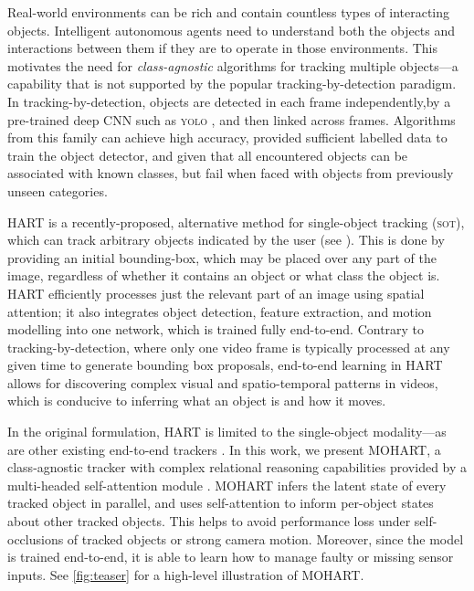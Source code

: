 Real-world environments can be rich and contain countless types of interacting objects.
Intelligent autonomous agents need to understand both the objects and interactions between them if they are to operate in those environments.
This motivates the need for \emph{class-agnostic} algorithms for tracking multiple objects---a capability that is not supported by the popular tracking-by-detection paradigm.
In tracking-by-detection, objects are detected in each frame independently,\eg by a pre-trained deep \gls{CNN} such as \textsc{yolo} \citep{Redmon15}, and then linked across frames. 
%
Algorithms from this family can achieve high accuracy, provided sufficient labelled data to train the object detector, and given that all encountered objects can be associated with known classes, but fail when faced with objects from previously unseen categories.
%

\Gls{HART} is a recently-proposed, alternative method for single-object tracking (\textsc{sot}), which can track arbitrary objects indicated by the user (see ).
%
This is done by providing an initial bounding-box, which may be placed over any part of the image, regardless of whether it contains an object or what class the object is.
% 
\Gls{HART} efficiently processes just the relevant part of an image using spatial attention; it also integrates object detection, feature extraction, and motion modelling into one network, which is trained fully end-to-end.
Contrary to tracking-by-detection, where only one video frame is typically processed at any given time to generate bounding box proposals, end-to-end learning in \gls{HART} allows for discovering complex visual and spatio-temporal patterns in videos, which is conducive to inferring what an object is and how it moves.
%

In the original formulation, \gls{HART} is limited to the single-object modality---as are other existing end-to-end trackers \citep{Kahou2015ratm,Danesh2019deep,Gordon2018re3}.
%
In this work, we present \gls{MOHART}, a class-agnostic tracker with complex relational reasoning capabilities provided by a multi-headed self-attention module \citep{Vaswani17,Lee2019set}. 
\Gls{MOHART} infers the latent state of every tracked object in parallel, and uses self-attention to inform per-object states about other tracked objects.
This helps to avoid performance loss under self-occlusions of tracked objects or strong camera motion.
Moreover, since the model is trained end-to-end, it is able to learn how to manage faulty or missing sensor inputs. See \cref{fig:teaser} for a high-level illustration of \gls{MOHART}.


